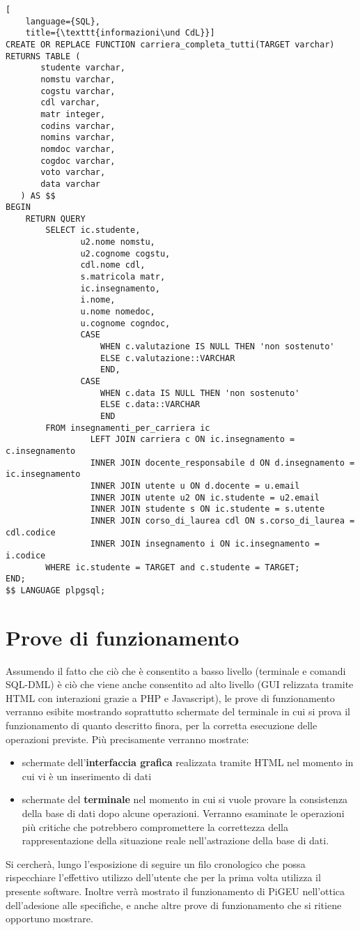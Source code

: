 \documentclass{article}
\newcommand{\und}[0]{\textunderscore}
\begin{document}
\begin{lstlisting}[
    language={SQL},
    title={\texttt{informazioni\und CdL}}]
CREATE OR REPLACE FUNCTION carriera_completa_tutti(TARGET varchar) RETURNS TABLE (
       studente varchar,
       nomstu varchar,
       cogstu varchar,
       cdl varchar,
       matr integer,
       codins varchar,
       nomins varchar,
       nomdoc varchar,
       cogdoc varchar,
       voto varchar,
       data varchar
   ) AS $$
BEGIN
    RETURN QUERY
        SELECT ic.studente,
               u2.nome nomstu,
               u2.cognome cogstu,
               cdl.nome cdl,
               s.matricola matr,
               ic.insegnamento,
               i.nome,
               u.nome nomedoc,
               u.cognome cogndoc,
               CASE
                   WHEN c.valutazione IS NULL THEN 'non sostenuto'
                   ELSE c.valutazione::VARCHAR
                   END,
               CASE
                   WHEN c.data IS NULL THEN 'non sostenuto'
                   ELSE c.data::VARCHAR
                   END
        FROM insegnamenti_per_carriera ic
                 LEFT JOIN carriera c ON ic.insegnamento = c.insegnamento
                 INNER JOIN docente_responsabile d ON d.insegnamento = ic.insegnamento
                 INNER JOIN utente u ON d.docente = u.email
                 INNER JOIN utente u2 ON ic.studente = u2.email
                 INNER JOIN studente s ON ic.studente = s.utente
                 INNER JOIN corso_di_laurea cdl ON s.corso_di_laurea = cdl.codice
                 INNER JOIN insegnamento i ON ic.insegnamento = i.codice
        WHERE ic.studente = TARGET and c.studente = TARGET;
END;
$$ LANGUAGE plpgsql;
\end{lstlisting}

\section{Prove di funzionamento}
Assumendo il fatto che ciò che è consentito a basso livello (terminale e comandi SQL-DML) è ciò che viene anche consentito ad alto livello (GUI relizzata tramite HTML con interazioni grazie a PHP e Javascript), le prove di funzionamento verranno esibite mostrando soprattutto schermate del terminale in cui si prova il funzionamento di quanto descritto finora, per la corretta esecuzione delle operazioni previste. Più precisamente verranno mostrate:
\begin{itemize}
    \item schermate dell'\textbf{interfaccia grafica} realizzata tramite HTML nel momento in cui vi è un inserimento di dati
    \item schermate del \textbf{terminale} nel momento in cui si vuole provare la consistenza della base di dati dopo alcune operazioni. Verranno esaminate le operazioni più critiche che potrebbero compromettere la correttezza della rappresentazione della situazione reale nell'astrazione della base di dati.
\end{itemize}
Si cercherà, lungo l'esposizione di seguire un filo cronologico che possa rispecchiare l'effettivo utilizzo dell'utente che per la prima volta utilizza il presente software. Inoltre verrà mostrato il funzionamento di PiGEU nell'ottica dell'adesione alle specifiche, e anche altre prove di funzionamento che si ritiene opportuno mostrare.
\end{document}
